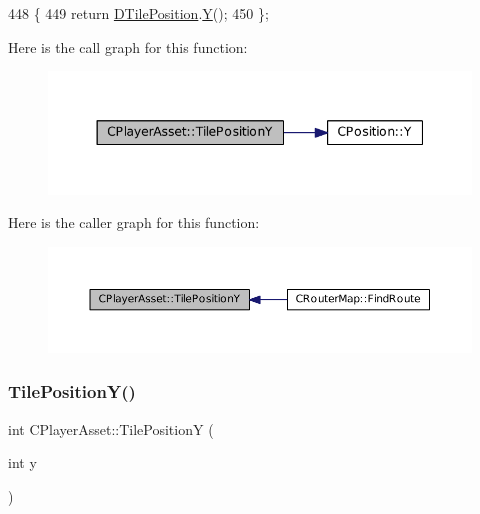 \begin{DoxyCode}
448                                  \{
449             \textcolor{keywordflow}{return} \hyperlink{classCPlayerAsset_a5b59a9d3b7db8c7fa194b80dafb96186}{DTilePosition}.\hyperlink{classCPosition_a1aa8a30e2f08dda1f797736ba8c13a87}{Y}();  
450         \};
\end{DoxyCode}
Here is the call graph for this function\+:
\nopagebreak
\begin{figure}[H]
\begin{center}
\leavevmode
\includegraphics[width=344pt]{classCPlayerAsset_a189adb25bf0a45117a9c0bb36b45e6a4_cgraph}
\end{center}
\end{figure}
Here is the caller graph for this function\+:
\nopagebreak
\begin{figure}[H]
\begin{center}
\leavevmode
\includegraphics[width=350pt]{classCPlayerAsset_a189adb25bf0a45117a9c0bb36b45e6a4_icgraph}
\end{center}
\end{figure}
\hypertarget{classCPlayerAsset_ad3ce562cbd27e2c35abe968a7ff19cd6}{}\label{classCPlayerAsset_ad3ce562cbd27e2c35abe968a7ff19cd6} 
\subsubsection{\texorpdfstring{Tile\+Position\+Y()}{TilePositionY()}\hspace{0.1cm}{\footnotesize\ttfamily [2/2]}}
{\footnotesize\ttfamily int C\+Player\+Asset\+::\+Tile\+PositionY (\begin{DoxyParamCaption}\item[{int}]{y }\end{DoxyParamCaption})}



